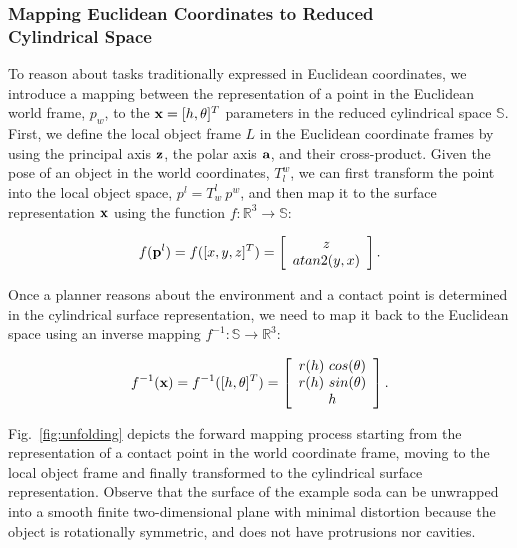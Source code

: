 \documentclass{aamas2015}
\begin{document}
\subsubsection{Mapping Euclidean Coordinates to Reduced \\Cylindrical Space}

To reason about tasks traditionally expressed in Euclidean coordinates, we introduce a mapping 
between the representation of a point in the Euclidean world frame, $p_w$, to the $\textbf{x} = [h,\theta]^T$
parameters in the reduced cylindrical space $\mathbb{S}$. First, we define the local object frame $L$ in the
Euclidean coordinate frames by using the principal axis $\textbf{z}$, the polar axis $\textbf{a}$, and
their cross-product. Given the pose of an object in the world coordinates, $T^w_l$, we can first
transform the point into the local object space, $p^l = T^l_w ~ p^w$, and then map it to the surface
representation $\textbf{x}$ using the function $f: \mathbb{R}^3 \rightarrow \mathbb{S}$: 

\begin{equation}
  f(\textbf{p}^l) = f([x,y,z]^T) = \left[ \begin{array}{c} z \\ atan2(y,x) \end{array}\right].
\end{equation}

Once a planner reasons about the environment and a contact point is determined in the cylindrical surface representation,
we need to map it back to the Euclidean space using an inverse mapping $f^{-1}: \mathbb{S} \rightarrow \mathbb{R}^3 $:

\begin{equation}
  f^{-1}(\textbf{x}) = f^{-1}([h, \theta]^T) = \left[ 
  \begin{array}{c}
  r(h) ~ cos(\theta) \\ r(h) ~ sin(\theta)\\ h 
  \end{array} \right]. 
\end{equation}

Fig.~\ref{fig:unfolding} depicts the forward mapping process starting from the representation of
a contact point in the world coordinate frame, moving to the local object frame and finally transformed
to the cylindrical surface representation. Observe that the surface of the example soda can be unwrapped
into a smooth finite two-dimensional plane with minimal distortion because the object is rotationally
symmetric, and does not have protrusions nor cavities. 
\end{document}
